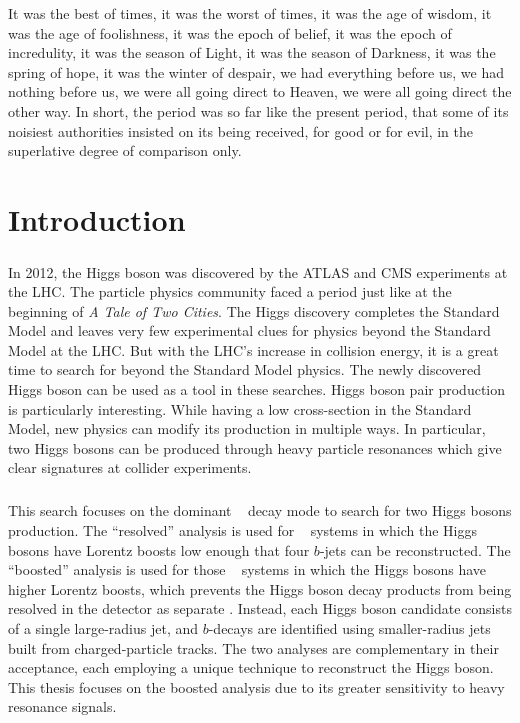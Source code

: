 \begin{savequote}[75mm]
It was the best of times, it was the worst of times, it was the age of wisdom, it was the age of foolishness, it was the epoch of belief, it was the epoch of incredulity, it was the season of Light, it was the season of Darkness, it was the spring of hope, it was the winter of despair, we had everything before us, we had nothing before us, we were all going direct to Heaven, we were all going direct the other way. In short, the period was so far like the present period, that some of its noisiest authorities insisted on its being received, for good or for evil, in the superlative degree of comparison only.
\end{savequote}

\chapter{Introduction}
\label{introduction}

\paragraph{}
In 2012, the Higgs boson was discovered by the ATLAS and CMS experiments at the LHC. 
The particle physics community faced a period just like at the beginning of \textit{A Tale of Two Cities}.
The Higgs discovery completes the Standard Model and leaves very few experimental clues for physics beyond the Standard Model at the LHC.
But with the LHC's increase in collision energy, it is a great time to search for beyond the Standard Model physics.
The newly discovered Higgs boson can be used as a tool in these searches.
Higgs boson pair production is particularly interesting.
While having a low cross-section in the Standard Model, new physics can modify its production in multiple ways. 
In particular, two Higgs bosons can be produced through heavy particle resonances
which give clear signatures at collider experiments.

\paragraph{}
This search focuses on the dominant \hbb~ decay mode to search for two Higgs bosons production. 
The ``resolved'' analysis is used for \hh~ systems in which the Higgs bosons have Lorentz boosts low enough that four $b$-jets can be reconstructed. 
The ``boosted'' analysis is used for those \hh~ systems in which the Higgs bosons have higher Lorentz boosts, which prevents the Higgs boson decay products from being resolved in the detector as separate \bjets. 
Instead, each Higgs boson candidate consists of a single large-radius jet, and $b$-decays are identified using smaller-radius jets built from charged-particle tracks.
The two analyses are complementary in their acceptance, each employing a unique technique to reconstruct the Higgs boson.
This thesis focuses on the boosted analysis due to its greater sensitivity to heavy resonance signals.

